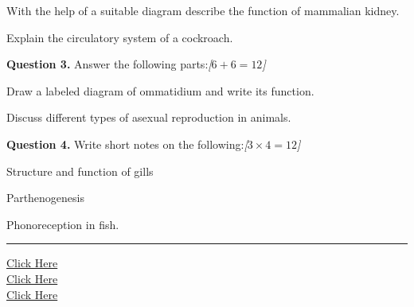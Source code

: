 \documentclass[11pt,a4paper]{article}
\newcommand{\pts}[1]{\hfill   \textit{[#1]}}
\begin{document}
\begin{parts}
  \item With the help of a suitable diagram describe the function of mammalian kidney.
  \item Explain the circulatory system of a cockroach.
\end{parts}

\medskip


\noindent   \textbf{Question 3.} Answer the following parts:\pts{$6 + 6 = 12$}

\begin{parts}
  \item Draw a labeled diagram of ommatidium and write its function.
  \item Discuss different types of asexual reproduction in animals.
\end{parts}

\medskip


\noindent   \textbf{Question 4.} Write short notes on the following:\pts{$3  \times 4 = 12$}

\begin{parts}
  \item Structure and function of gills
  \item Parthenogenesis
  \item Phonoreception in fish.
\end{parts}

\vfill
\rule{\linewidth}{0.4pt}

\begin{center}\small
\href{https://bhu-exam.vercel.app/}{Click Here}\\[4pt]\href{https://me-aryan.vercel.app/}{Click Here}\\[4pt]\href{https://quashan-me.vercel.app/}{Click Here}
\end{center}
\end{document}
